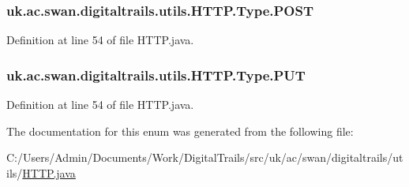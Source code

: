 \hypertarget{enumuk_1_1ac_1_1swan_1_1digitaltrails_1_1utils_1_1_h_t_t_p_1_1_type_a93f55c4a4367bf1b011fcc56c14effd3}{
\subsubsection[{P\+O\+S\+T}]{\setlength{\rightskip}{0pt plus 5cm}uk.\+ac.\+swan.\+digitaltrails.\+utils.\+H\+T\+T\+P.\+Type.\+P\+O\+S\+T}}\label{enumuk_1_1ac_1_1swan_1_1digitaltrails_1_1utils_1_1_h_t_t_p_1_1_type_a93f55c4a4367bf1b011fcc56c14effd3}


Definition at line 54 of file H\+T\+T\+P.\+java.

\hypertarget{enumuk_1_1ac_1_1swan_1_1digitaltrails_1_1utils_1_1_h_t_t_p_1_1_type_ac3cbdcf63a8259524233fc7db349723f}{
\subsubsection[{P\+U\+T}]{\setlength{\rightskip}{0pt plus 5cm}uk.\+ac.\+swan.\+digitaltrails.\+utils.\+H\+T\+T\+P.\+Type.\+P\+U\+T}}\label{enumuk_1_1ac_1_1swan_1_1digitaltrails_1_1utils_1_1_h_t_t_p_1_1_type_ac3cbdcf63a8259524233fc7db349723f}


Definition at line 54 of file H\+T\+T\+P.\+java.



The documentation for this enum was generated from the following file\+:\begin{DoxyCompactItemize}
\item 
C\+:/\+Users/\+Admin/\+Documents/\+Work/\+Digital\+Trails/src/uk/ac/swan/digitaltrails/utils/\hyperlink{_h_t_t_p_8java}{H\+T\+T\+P.\+java}\end{DoxyCompactItemize}
